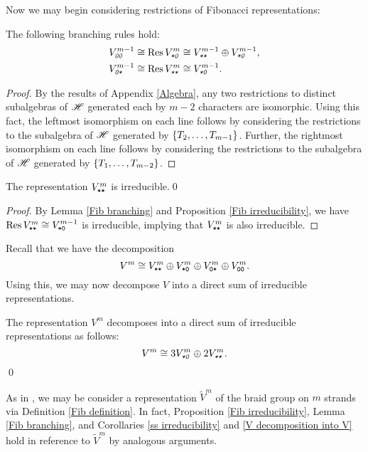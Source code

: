 \documentclass{amsart}
\begin{document}
Now we may begin considering restrictions of Fibonacci representations:
\begin{lemma}\label{Fib branching}
  The following branching rules hold:
  \begin{align*}
    \emph{$V^{m-1}_{\texttt{0}\texttt{0}}$} \cong \emph{$\operatorname{Res} V_{\texttt{*}\texttt{0}}^m$} &\cong \emph{$V^{m-1}_{\texttt{*}\texttt{*}} \oplus V^{m-1}_{\texttt{*}\texttt{0}}$},\\
    \emph{$V_{\texttt{0}\texttt{*}}^{m-1} \cong \operatorname{Res} V_{\texttt{*}\texttt{*}}^m$} &\cong \emph{$V_{\texttt{*}\texttt{0}}^{m-1}$}.
  \end{align*}
\end{lemma}
\begin{proof}
  By the results of Appendix \ref{Algebra}, any two restrictions to distinct subalgebras of $\mathscr{H}$ generated each by $m-2$ characters are isomorphic.
  Using this fact, the leftmost isomorphism on each line follows by considering the restrictions to the subalgebra of $\mathscr{H}$ generated by $\left\{ T_2,\dots,T_{m-1} \right\}$.
  Further, the rightmost isomorphism on each line follows by considering the restrictions to the subalgebra of $\mathscr{H}$ generated by $\left\{ T_1,\dots,T_{m-2} \right\}$.
\end{proof}
\begin{corollary}\label{ss irreducibility}
  The representation \emph{$V^m_{\texttt{*}\texttt{*}}$} is irreducible.\qed
\end{corollary}
\begin{proof}
  By Lemma \ref{Fib branching} and Proposition \ref{Fib irreducibility}, we have $\operatorname{Res} V^m_{\texttt{*}\texttt{*}} \cong V^{m-1}_{\texttt{*}\texttt{0}}$ is irreducible, implying that $V^m_{\texttt{*}\texttt{*}}$ is also irreducible.
\end{proof}
Recall that we have the decomposition
\[
  V^m \cong V^m_{\texttt{*}\texttt{*}} \oplus V^m_{\texttt{*}\texttt{0}} \oplus V^m_{\texttt{0}\texttt{*}} \oplus V^m_{\texttt{0}\texttt{0}}.
\]
Using this, we may now decompose $V$ into a direct sum of irreducible representations.
\begin{corollary}\label{V decomposition into V}
  The representation $V^m$ decomposes into a direct sum of irreducible representations as follows:
  \[
    \emph{$V^m \cong 3V^m_{\texttt{*}\texttt{0}} \oplus 2V^m_{\texttt{*}\texttt{*}}$.}
  \]\qed
\end{corollary}

\begin{remark}
  As in \cite{Shor}, we may be consider a representation $\tilde V^m$ of the braid group on $m$ strands via Definition \ref{Fib definition}. 
  In fact, Proposition \ref{Fib irreducibility}, Lemma \ref{Fib branching}, and Corollaries \ref{ss irreducibility} and \ref{V decomposition into V} hold in reference to $\tilde V^m$ by analogous arguments.
\end{remark}
\end{document}
